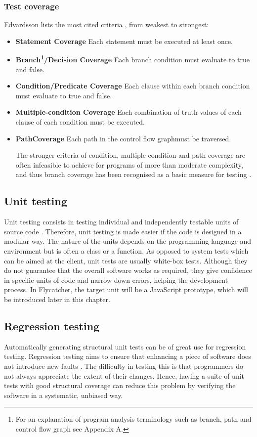\documentclass[a4paper,11pt,titlepage]{report}
\begin{document}
\subsubsection{Test coverage}
Edvardsson lists the most cited criteria \cite{edvardsson1999survey}, from weakest to strongest:
\begin{itemize}
	\item \textbf{Statement Coverage} Each statement must be executed at least once.
 	\item \textbf{Branch\footnote{For an explanation of program analysis terminology such as branch, path and control flow graph see Appendix A.}/Decision Coverage} Each branch condition must evaluate to true and false.
 	\item \textbf{Condition/Predicate Coverage} Each clause within each branch condition must evaluate to true and false.
 	\item \textbf{Multiple-condition Coverage} Each combination of truth values of each clause of each condition must be executed.
 	\item \textbf{Path\footnotemark[\value{footnote}] Coverage} Each path in the control flow graph\footnotemark[\value{footnote}] must be traversed.

The stronger criteria of condition, multiple-condition and path coverage are often infeasible to achieve for programs of more than moderate complexity, and thus branch coverage has been recognised as a basic measure for testing \cite{edvardsson1999survey}.
\end{itemize}

\subsection{Unit testing}

Unit testing consists in testing individual and independently testable units of source code \cite{myers2011art}. Therefore, unit testing is made easier if the code is designed in a modular way. The nature of the units depends on the programming language and environment but is often a class or a function. As opposed to system tests which can be aimed at the client, unit tests are usually white-box tests. Although they do not guarantee that the overall software works as required, they give confidence in specific units of code and narrow down errors, helping the development process. In Flycatcher, the target unit will be a JavaScript prototype, which will be introduced later in this chapter.

\subsection{Regression testing}
Automatically generating structural unit tests can be of great use for regression testing. Regression testing aims to ensure that enhancing a piece of software does not introduce new faults \cite{myers2011art}. The difficulty in testing this is that programmers do not always appreciate the extent of their changes. Hence, having a suite of unit tests with good structural coverage can reduce this problem by verifying the software in a systematic, unbiased way.
\end{document}
